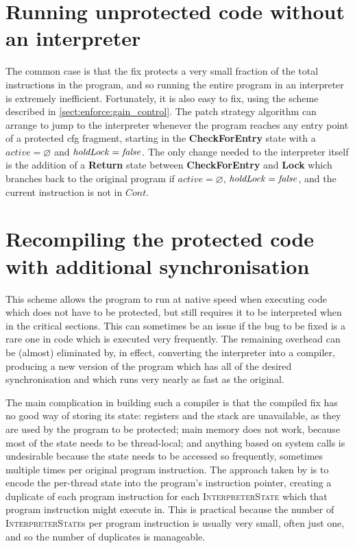 \section{Running unprotected code without an interpreter}

The common case is that the fix protects a very small fraction of the
total instructions in the program, and so running the entire program
in an interpreter is extremely inefficient.  Fortunately, it is also
easy to fix, using the scheme described in
\autoref{sect:enforce:gain_control}.  The patch strategy algorithm can
arrange to jump to the interpreter whenever the program reaches any
entry point of a protected \gls{cfg} fragment, starting in the
\textbf{CheckForEntry} state with a $\mathit{active} = \varnothing$
and $\mathit{holdLock} = \mathit{false}$.  The only change needed to the
interpreter itself is the addition of a \textbf{Return} state between
\textbf{CheckForEntry} and \textbf{Lock} which branches back to the
original program if $\mathit{active} = \varnothing$,
$\mathit{holdLock} = \mathit{false}$, and the current instruction is not in
$\mathit{Cont}$.

\section{Recompiling the protected code with additional synchronisation}

This scheme allows the program to run at native speed when executing
code which does not have to be protected, but still requires it to be
interpreted when in the critical sections.  This can sometimes be an
issue if the bug to be fixed is a rare one in code which is executed
very frequently.  The remaining overhead can be (almost) eliminated
by, in effect, converting the interpreter into a compiler, producing a
new version of the program which has all of the desired
synchronisation and which runs very nearly as fast as the original.

The main complication in building such a compiler is that the compiled
fix has no good way of storing its state: registers and the stack are
unavailable, as they are used by the program to be protected; main
memory does not work, because most of the state needs to be
thread-local; and anything based on system calls is undesirable
because the state needs to be accessed so frequently, sometimes
multiple times per original program instruction.  The approach taken
by {\implementation} is to encode the per-thread state into the
program's instruction pointer, creating a duplicate of each program
instruction for each \textsc{InterpreterState} which that program
instruction might execute in.  This is practical because the number of
\textsc{InterpreterState}s per program instruction is usually very
small, often just one, and so the number of duplicates is manageable.

